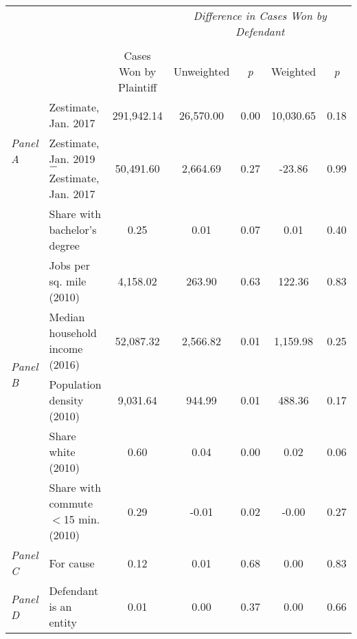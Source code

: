 \begin{tabular}{llccccc}
\toprule
 &  & \textit{} & \multicolumn{4}{c}{\textit{Difference in Cases Won by Defendant}} \\
\cline{4-7}
\\
 &  & Cases Won by Plaintiff & Unweighted & \emph{p} & Weighted & \emph{p} \\
\midrule
\multirow[c]{2}{3cm}{\textit{Panel A}} & Zestimate, Jan. 2017 & 291,942.14 & 26,570.00 & 0.00 & 10,030.65 & 0.18 \\
 & Zestimate, Jan. 2019 $-$ Zestimate, Jan. 2017 & 50,491.60 & 2,664.69 & 0.27 & -23.86 & 0.99 \\
\cline{1-7}
\multirow[c]{6}{3cm}{\textit{Panel B}} & Share with bachelor's degree & 0.25 & 0.01 & 0.07 & 0.01 & 0.40 \\
 & Jobs per sq. mile (2010) & 4,158.02 & 263.90 & 0.63 & 122.36 & 0.83 \\
 & Median household income (2016) & 52,087.32 & 2,566.82 & 0.01 & 1,159.98 & 0.25 \\
 & Population density (2010) & 9,031.64 & 944.99 & 0.01 & 488.36 & 0.17 \\
 & Share white (2010) & 0.60 & 0.04 & 0.00 & 0.02 & 0.06 \\
 & Share with commute $<$15 min. (2010) & 0.29 & -0.01 & 0.02 & -0.00 & 0.27 \\
\cline{1-7}
\textit{Panel C} & For cause & 0.12 & 0.01 & 0.68 & 0.00 & 0.83 \\
\cline{1-7}
\textit{Panel D} & Defendant is an entity & 0.01 & 0.00 & 0.37 & 0.00 & 0.66 \\
\cline{1-7}
\bottomrule
\end{tabular}
